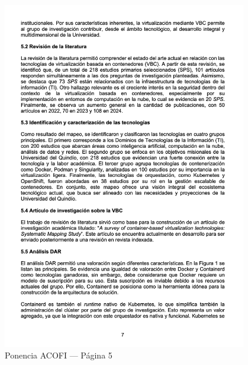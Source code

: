 \begin{figure}[H]
    \centering
    \begin{tcolorbox}[
        colback=white,
        colframe=gray!50,
        boxrule=1pt,
        arc=2pt,
        boxsep=5pt,
        left=3pt,
        right=3pt,
        top=3pt,
        bottom=3pt,
        drop shadow
    ]
        \includegraphics[width=0.95\textwidth,keepaspectratio]{apendices/ACOFI/pagina_5.png}
    \end{tcolorbox}
    \caption{Ponencia ACOFI --- Página 5}\label{fig:acofi-pagina-5}
\end{figure}
\FloatBarrier%
